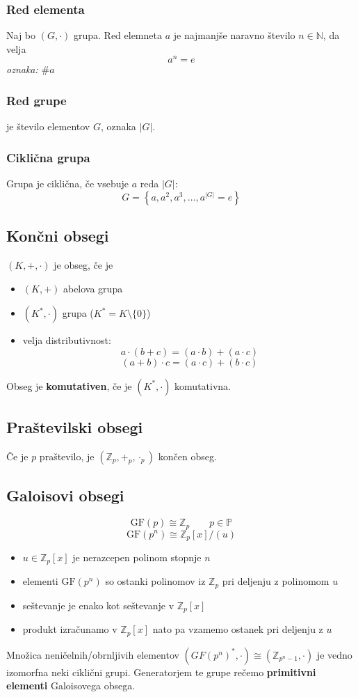 \begin{multicols}{5}
\subsubsection{Red elementa}
Naj bo $(G,\cdot)$ grupa. Red elemneta $a$ je najmanjše naravno število $n \in \mathbb{N}$, da velja
\[a^n = e\]
\textit{oznaka:} $\#a$

\subsubsection{Red grupe}
je število elementov $G$, oznaka $|G|$.

\subsubsection*{Ciklična grupa}
Grupa je ciklična, če vsebuje $a$ reda $|G|$:
\[ G = \left\{ a, a^2, a^3, \dots, a^{|G|} = e\right\}\]

\subsection*{Končni obsegi}
$(K, +,\cdot)$ je obseg, če je
\begin{itemize}
	\item $(K, +)$ abelova grupa
	\item $(K^*, \cdot)$ grupa ($K^* = K \setminus \{0\}$)
	\item velja distributivnost:
	\[ a \cdot (b+c) = (a\cdot b) + (a \cdot c)\]
	\[ (a+b) \cdot c = (a\cdot c) + (b \cdot c)\]
\end{itemize}

Obseg je \textbf{komutativen}, če je $(K^*, \cdot)$ komutativna.

\subsection*{Praštevilski obsegi}
Če je $p$ praštevilo, je $(\mathbb{Z}_p, +_p, \cdot_p)$ končen obseg.


\subsection*{Galoisovi obsegi}
\[\text{GF}(p) \cong \mathbb{Z}_p \qquad p \in \mathbb{P}\]
\[ \text{GF}(p^n) \cong \mathbb{Z}_p[x]/(u) \]
\begin{itemize}
	\item $u \in \mathbb{Z}_p[x]$ je nerazcepen polinom stopnje $n$
	\item elementi $\text{GF}(p^n)$ so ostanki polinomov iz $\mathbb{Z}_p$ pri deljenju z polinomom $u$
	\item seštevanje je enako kot seštevanje v $\mathbb{Z}_p[x]$
	\item produkt izračunamo v $\mathbb{Z}_p[x]$ nato pa vzamemo ostanek pri deljenju z $u$
\end{itemize}

Množica neničelnih/obrnljivih elementov $(GF(p^n)^*, \cdot) \cong (\mathbb{Z}_{p^n-1}, \cdot)$ je vedno izomorfna neki ciklični grupi.
Generatorjem te grupe rečemo \textbf{primitivni elementi} Galoisovega obsega.

\end{multicols}
